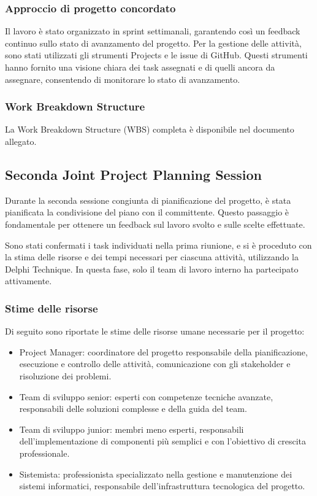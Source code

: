 \subsubsection{Approccio di progetto concordato}
Il lavoro è stato organizzato in sprint settimanali, garantendo così un feedback continuo sullo stato di avanzamento del progetto. 
Per la gestione delle attività, sono stati utilizzati gli strumenti Projects e le issue di GitHub. Questi strumenti hanno fornito 
una visione chiara dei task assegnati e di quelli ancora da assegnare, consentendo di monitorare lo stato di avanzamento.

\subsubsection{Work Breakdown Structure}
La Work Breakdown Structure (WBS) completa è disponibile nel documento allegato.

\subsection{Seconda Joint Project Planning Session}
Durante la seconda sessione congiunta di pianificazione del progetto, è stata pianificata la condivisione del piano con il committente. 
Questo passaggio è fondamentale per ottenere un feedback sul lavoro svolto e sulle scelte effettuate.

Sono stati confermati i task individuati nella prima riunione, e si è proceduto con la stima delle risorse e dei tempi necessari per 
ciascuna attività, utilizzando la Delphi Technique. In questa fase, solo il team di lavoro interno ha partecipato attivamente.

\subsubsection{Stime delle risorse}
Di seguito sono riportate le stime delle risorse umane necessarie per il progetto:

\begin{itemize}
    \item Project Manager: coordinatore del progetto responsabile della pianificazione, esecuzione e controllo delle attività, 
    comunicazione con gli stakeholder e risoluzione dei problemi.
    \item Team di sviluppo senior: esperti con competenze tecniche avanzate, responsabili delle soluzioni complesse e della guida del team.
    \item Team di sviluppo junior: membri meno esperti, responsabili dell'implementazione di componenti più semplici e con 
    l'obiettivo di crescita professionale.
    \item Sistemista: professionista specializzato nella gestione e manutenzione dei sistemi informatici, responsabile dell'infrastruttura 
    tecnologica del progetto.
\end{itemize}

